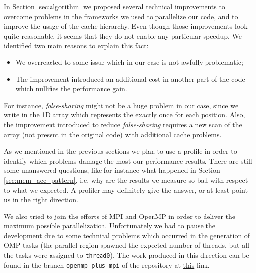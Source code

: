 \documentclass{article}
\begin{document}
In Section \ref{sec:algorithm} we proposed several technical improvements to
overcome problems in the frameworks we used to parallelize our code, and
to improve the usage of the cache hierarchy. Even though those improvements
look quite reasonable, it seems that they do not enable any particular speedup.
We identified two main reasons to explain this fact:
\begin{itemize}
    \item We overreacted to some issue which in our case is not awfully
    problematic;
    \item The improvement introduced an additional cost in another part of the
    code which nullifies the performance gain.
\end{itemize}
For instance, \emph{false-sharing} might not be a huge problem in our case,
since we write in the 1D array which represents the \kdtree{} exactly once for
each position. Also, the improvement introduced to reduce \emph{false-sharing}
requires a new scan of the array (not present in the original code) with
additional cache problems.

As we mentioned in the previous sections we plan to use a profile in order to
identify which problems damage the most our performance results. There are still
some unanswered questions, like for instance what happened in Section
\ref{sec:mem_acc_pattern}, i.e. why are the results we measure so bad with
respect to what we expected. A profiler may definitely give the answer, or at
least point us in the right direction.

We also tried to join the efforts of MPI and OpenMP in order to deliver the
maximum possible parallelization. Unfortunately we had to pause the development
due to some technical problems which occurred in the generation of OMP tasks
(the parallel region spawned the expected number of threads, but all the tasks
were assigned to \texttt{thread0}). The work produced in this direction
can be found in the branch \texttt{openmp-plus-mpi} of the repository at
\href{https://github.com/fAndreuzzi/parallel-kd-tree/tree/openmp-plus-mpi}{this}
link.


\end{document}

